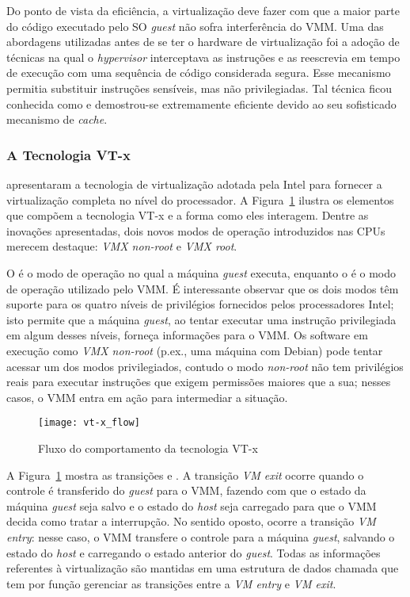 Do ponto de vista da eficiência, a virtualização deve fazer com que a maior
parte do código executado pelo SO \emph{guest} não sofra interferência do VMM.
Uma das abordagens utilizadas antes de se ter o hardware de virtualização foi a
adoção de técnicas na qual o \textit{hypervisor} interceptava as instruções e
as reescrevia em tempo de execução com uma sequência de código considerada
segura. Esse mecanismo permitia substituir instruções sensíveis, mas não
privilegiadas. Tal técnica ficou conhecida como 
e demostrou-se extremamente eficiente devido ao seu sofisticado mecanismo de
\emph{cache}.


\subsubsection{A Tecnologia VT-x}
\label{sec:vtx}

\citet{uhlig} apresentaram a tecnologia de virtualização adotada pela Intel para
fornecer a virtualização completa no nível do processador. A
Figura~\ref{fig:vt-x_flow} ilustra os elementos que compõem a tecnologia VT-x e a
forma como eles interagem. Dentre as inovações apresentadas, dois novos modos
de operação introduzidos nas CPUs merecem destaque: \emph{VMX non-root} e
\emph{VMX root}.

O  é o modo de operação no qual a máquina
\emph{guest} executa, enquanto o  é o modo de operação utilizado
pelo VMM. É interessante observar que os dois modos têm suporte para os quatro
níveis de privilégios fornecidos pelos processadores Intel; isto permite que a
máquina \emph{guest}, ao tentar executar uma instrução privilegiada em algum
desses níveis, forneça informações para o VMM. Os software em execução como
\emph{VMX non-root} (p.ex., uma máquina com Debian) pode tentar acessar um dos
modos privilegiados, contudo o modo \emph{non-root} não tem privilégios reais
para executar instruções que exigem permissões maiores que a sua; nesses casos,
o VMM entra em ação para intermediar a situação.

\begin{figure}[!h]
  \centering
  \texttt{[image: vt-x\_flow]} 
  \caption{Fluxo do comportamento da tecnologia VT-x}
  \label{fig:vt-x_flow}
\end{figure}

A Figura~\ref{fig:vt-x_flow} mostra as transições  e
. A transição \emph{VM exit} ocorre quando o controle é
transferido do \emph{guest} para o VMM, fazendo com que o estado da máquina
\emph{guest} seja salvo e o estado do \emph{host} seja carregado para que o VMM
decida como tratar a interrupção. No sentido oposto, ocorre a transição
\emph{VM entry}: nesse caso, o VMM transfere o controle para a máquina
\emph{guest}, salvando o estado do \emph{host} e carregando o estado
anterior do \emph{guest}. Todas as informações referentes à virtualização são
mantidas em uma estrutura de dados chamada  que tem por função gerenciar as transições entre a
\emph{VM entry} e \emph{VM exit}.

